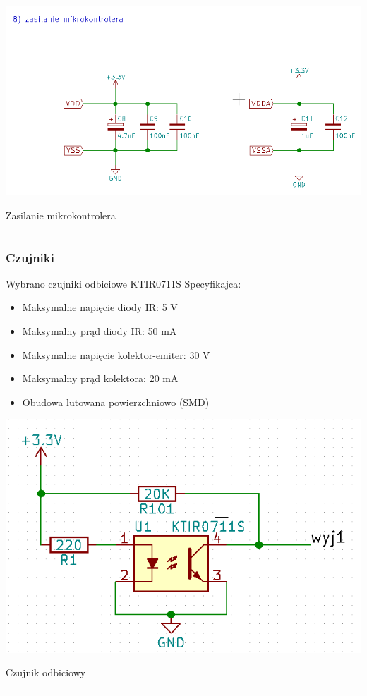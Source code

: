 \documentclass[12pt,a4paper]{article}
\begin{document}
\begin{center}
\includegraphics[scale=0.6]{zasilaniemikroklocka.png}
\caption{Zasilanie mikrokontrolera}
\vspace*{1cm}
\noindent \rule{\linewidth}{0.4mm}
\end{center}

\subsubsection{Czujniki}

Wybrano czujniki odbiciowe KTIR0711S
\newline Specyfikajca:
\begin{itemize}
\item Maksymalne napięcie diody IR: 5 V
\item Maksymalny prąd diody IR: 50 mA
\item Maksymalne napięcie kolektor-emiter: 30 V
\item Maksymalny prąd kolektora: 20 mA
\item Obudowa lutowana powierzchniowo (SMD)
\end{itemize}

\begin{center}
\includegraphics[scale=0.5]{KTIR.png}
\caption{Czujnik odbiciowy}
\vspace*{1cm}
\noindent \rule{\linewidth}{0.4mm}
\end{center}
\end{document}
